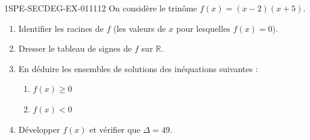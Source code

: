 \begin{exercice}{1SPE-SECDEG-EX-011}{1}{12}
On considère le trinôme $f(x) = (x-2)(x+5)$.

\begin{enumerate}
  \item Identifier les racines de $f$ (les valeurs de $x$ pour lesquelles $f(x) = 0$).
  \item Dresser le tableau de signes de $f$ sur $\mathbb{R}$.
  \item En déduire les ensembles de solutions des inéquations suivantes :
  \begin{enumerate}
    \item $f(x) \geqslant 0$
    \item $f(x) < 0$
  \end{enumerate}
  \item Développer $f(x)$ et vérifier que $\Delta = 49$.
\end{enumerate}
\end{exercice}
